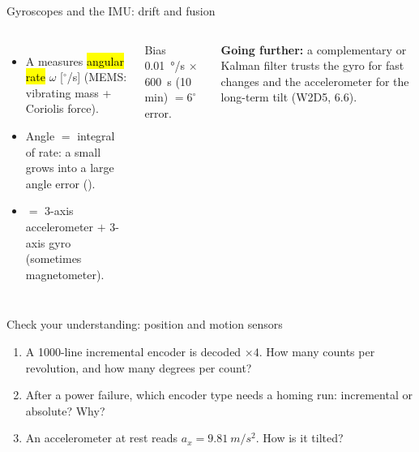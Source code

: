 \documentclass[aspectratio=169,10pt]{beamer}
\newcommand{\gofurther}[1]{{\footnotesize\color{mkGray}\textbf{\color{mkMid}Going further:} #1}}
\begin{document}
\begin{frame}{Gyroscopes and the IMU: drift and fusion}
\begin{columns}[T]
\centering
{}
\begin{itemize}\small
\item A  measures \hl{angular rate} $\omega$ [$^\circ$/s] (MEMS: vibrating mass + Coriolis force).
\item Angle $=$ integral of rate: a small  grows into a large angle error ().
\item {} $=$ 3-axis accelerometer $+$ 3-axis gyro (sometimes magnetometer).
\end{itemize}
\begin{keybox}
\small Bias \SI{0.01}{\degree/s} $\times$ \SI{600}{s} (10 min) $=6^\circ$ error.
\end{keybox}
\gofurther{a complementary or Kalman filter trusts the gyro for fast changes and the accelerometer for the long-term tilt (W2D5, 6.6).}
\end{columns}
\end{frame}

\begin{frame}{Check your understanding: position and motion sensors}
\begin{keybox}
\large
\begin{enumerate}
\item A 1000-line incremental encoder is decoded $\times4$. How many counts per revolution, and how many degrees per count?
\item After a power failure, which encoder type needs a homing run: incremental or absolute? Why?
\item An accelerometer at rest reads $a_x=\SI{9.81}{m/s^2}$. How is it tilted?
\end{enumerate}
\end{keybox}
\end{frame}
\end{document}
